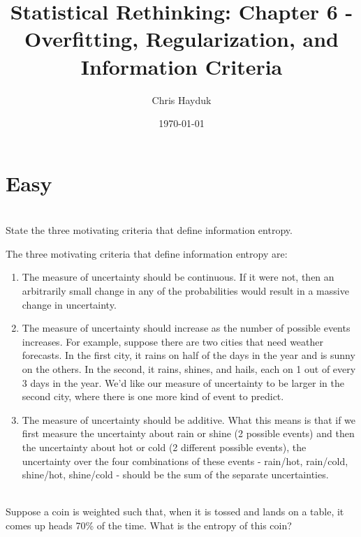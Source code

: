 \documentclass[12pt]{article}\usepackage[]{graphicx}\usepackage[]{color}
\newenvironment{problem}[2][Problem]{\begin{trivlist}
\item[\hskip \labelsep {\bfseries #1}\hskip \labelsep {\bfseries #2.}]}{\end{trivlist}}
\begin{document}
\title{Statistical Rethinking: Chapter 6 - Overfitting, Regularization, and Information Criteria}

\author{Chris Hayduk}
\date{\today}

\maketitle



\section{Easy}

\begin{problem}{6E1}
\text{ }\\
State the three motivating criteria that define information entropy.
\end{problem}

The three motivating criteria that define information entropy are:
\begin{enumerate}
	\item The measure of uncertainty should be continuous. If it were not, then an arbitrarily small change in any of the probabilities would result in a massive change in uncertainty.
	\item The measure of uncertainty should increase as the number of possible events increases. For example, suppose there are two cities that need weather forecasts. In the first city, it rains on half of the days in the year and is sunny on the others. In the second, it rains, shines, and hails, each on 1 out of every 3 days in the year. We'd like our measure of uncertainty to be larger in the second city, where there is one more kind of event to predict.
	\item The measure of uncertainty should be additive. What this means is that if we first measure the uncertainty about rain or shine (2 possible events) and then the uncertainty about hot or cold (2 different possible events), the uncertainty over the four combinations of these events - rain/hot, rain/cold, shine/hot, shine/cold - should be the sum of the separate uncertainties.
\end{enumerate}

\begin{problem}{6E2}
\text{ }\\
Suppose a coin is weighted such that, when it is tossed and lands on a table, it comes up heads 70\% of the time. What is the entropy of this coin?
\end{problem}
\end{document}
